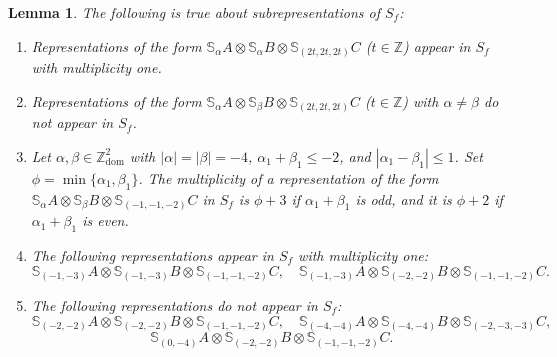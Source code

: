 \documentclass[11pt,reqno]{amsart}
\newcommand{\oo}{\otimes}
\newcommand{\bS}{\mathbb{S}}
\newcommand{\dom}{\operatorname{dom}}
\newtheorem{lemma}[theorem]{Lemma}
\numberwithin{equation}{section}
\begin{document}
\begin{lemma}\label{charSfn3}
The following is true about subrepresentations of $S_f$:
\begin{enumerate}
\item Representations of the form $\bS_{\alpha}A\oo \bS_{\alpha}B\oo \bS_{(2t,2t,2t)}C$ ($t\in \mathbb{Z}$) appear in $S_f$ with multiplicity one.
\item Representations of the form $\bS_{\alpha}A\oo \bS_{\beta}B\oo \bS_{(2t,2t,2t)}C$ ($t\in \mathbb{Z}$) with $\alpha\neq \beta$ do not appear in $S_f$.
\item Let $\alpha,\beta \in \mathbb{Z}^2_{\dom}$ with $|\alpha|=|\beta|=-4$, $\alpha_1+\beta_1\leq -2$, and $|\alpha_1-\beta_1|\leq 1$. Set $\phi=\min\{\alpha_1,\beta_1\}$. The multiplicity of a representation of the form $\bS_{\alpha}A\oo\bS_{\beta}B\oo \bS_{(-1,-1,-2)}C$ in $S_f$ is $\phi+3$ if $\alpha_1+\beta_1$ is odd, and it is $\phi+2$ if $\alpha_1+\beta_1$ is even.
\item The following representations appear in $S_f$ with multiplicity one:
$$
\bS_{(-1,-3)}A\oo \bS_{(-1,-3)}B\oo \bS_{(-1,-1,-2)}C,\quad \bS_{(-1,-3)}A\oo \bS_{(-2,-2)}B\oo \bS_{(-1,-1,-2)}C.
$$
\item The following representations do not appear in $S_f$:
$$
\bS_{(-2,-2)}A\oo \bS_{(-2,-2)}B\oo \bS_{(-1,-1,-2)}C,\quad \bS_{(-4,-4)}A\oo \bS_{(-4,-4)}B\oo \bS_{(-2,-3,-3)}C,
$$
$$
\bS_{(0,-4)}A\oo \bS_{(-2,-2)}B\oo \bS_{(-1,-1,-2)}C.
$$
\end{enumerate}
\end{lemma}
\end{document}
